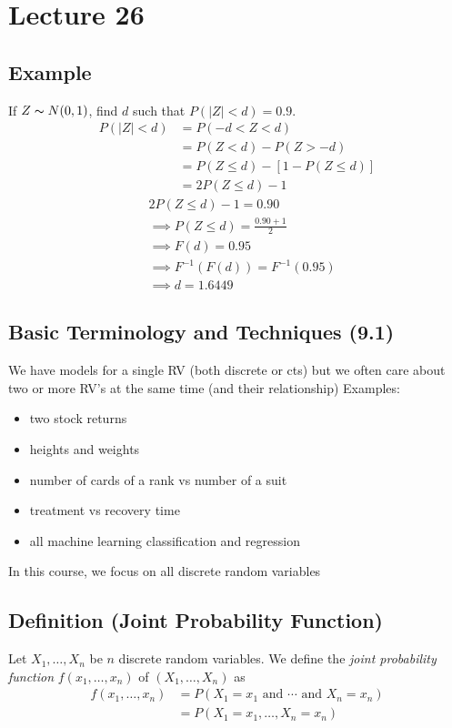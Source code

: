 \section{Lecture 26}
\subsection{Example}
If $ Z \thicksim N(0,1) $, find $ d $ such that $ P(|Z|<d)=0.9 $.
\begin{align*}
    P(|Z|<d)&=P(-d<Z<d)\\
    &=P(Z<d)-P(Z>-d)\\
    &=P(Z\le d)-\left[ 1-P(Z\le d) \right]\\
    &=2P(Z\le d)-1
\end{align*}
\begin{align*}
    &2P(Z\le d)-1=0.90\\
    &\implies P(Z\le d)=\frac{0.90+1}{2}\\
    &\implies F(d)=0.95\\
    &\implies F^{-1}(F(d))=F^{-1}(0.95)\\
    &\implies d=1.6449
\end{align*}

\subsection{Basic Terminology and Techniques (9.1)}
We have models for a single RV (both discrete or cts) but we often
care about two or more RV's at the same time (and their relationship)
Examples:
\begin{itemize}
    \item two stock returns
    \item heights and weights
    \item number of cards of a rank vs number of a suit
    \item treatment vs recovery time
    \item all machine learning classification and regression
\end{itemize}
In this course, we focus on all discrete random variables

\begin{defbox}
    \subsection{Definition (Joint Probability Function)}
    Let $ X_1,\ldots,X_n $ be $ n $ discrete random variables.
    We define the \emph{joint probability function} $ f(x_1,\ldots,x_n) $ of
    $ (X_1,\ldots,X_n) $ as
    \begin{align*}
        f(x_1,\ldots,x_n)&=P(X_1=x_1 \text{ and } \cdots \text{ and } X_n=x_n)\\
        &=P(X_1=x_1,\ldots,X_n=x_n)
    \end{align*}
\end{defbox}

